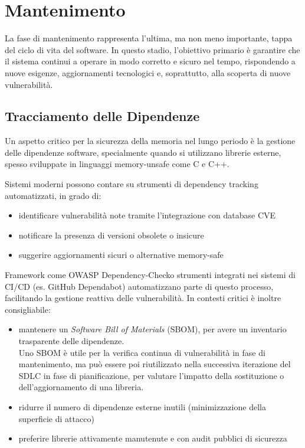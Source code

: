 \section{Mantenimento}
\label{sec:maintenance}

La fase di mantenimento rappresenta l'ultima, ma non meno importante, tappa del ciclo
di vita del software. In questo stadio, l'obiettivo primario è garantire che il sistema
continui a operare in modo corretto e sicuro nel tempo, rispondendo a nuove
esigenze, aggiornamenti tecnologici e, soprattutto, alla scoperta di nuove vulnerabilità.

\subsection{Tracciamento delle Dipendenze}
\label{sec:tracciamento-dipendenze}

Un aspetto critico per la sicurezza della memoria nel lungo periodo è la
gestione delle dipendenze software, specialmente quando si utilizzano librerie esterne,
spesso sviluppate in linguaggi memory-unsafe come C e C++.

Sistemi moderni possono contare su strumenti di dependency tracking
automatizzati, in grado di:
\begin{itemize}
  \item identificare vulnerabilità note tramite l'integrazione con database CVE

  \item notificare la presenza di versioni obsolete o insicure

  \item suggerire aggiornamenti sicuri o alternative memory-safe
\end{itemize}

Framework come OWASP Dependency-Check\footnotemark o strumenti integrati nei
sistemi di CI/CD (es. GitHub Dependabot) automatizzano parte di questo processo,
facilitando la gestione reattiva delle vulnerabilità. In contesti critici è inoltre
consigliabile: 
\begin{itemize}
  \item mantenere un \textit{Software Bill of Materials} (SBOM), per avere un inventario
    trasparente delle dipendenze. \\ Uno SBOM è utile per la verifica continua
    di vulnerabilità in fase di mantenimento, ma può essere poi riutilizzato nella
    successiva iterazione del SDLC in fase di pianificazione, per valutare l'impatto
    della sostituzione o dell'aggiornamento di una libreria.

  \item ridurre il numero di dipendenze esterne inutili (minimizzazione della
    superficie di attacco)

  \item preferire librerie attivamente manutenute e con audit pubblici di sicurezza
\end{itemize}

